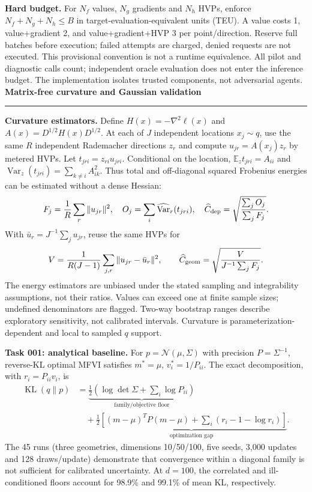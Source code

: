 \documentclass[11pt,a4paper]{article}
\newcommand{\sectiontitle}[2]{\vspace*{1mm}{\large\bfseries\textcolor{muted}{#1}}\\[2pt]{\LARGE\bfseries\textcolor{ink}{#2}}\par\vspace{2mm}\hrule\vspace{3mm}}
\newcommand{\KL}{\operatorname{KL}}
\newcommand{\E}{\mathbb E}
\begin{document}
\textbf{Hard budget.} For $N_f$ values, $N_g$ gradients and $N_h$ HVPs, enforce $N_f+N_g+N_h\le B$ in target-evaluation-equivalent units (TEU). A value costs 1, value+gradient 2, and value+gradient+HVP 3 per point/direction. Reserve full batches before execution; failed attempts are charged, denied requests are not executed. This provisional convention is not a runtime equivalence. All pilot and diagnostic calls count; independent oracle evaluation does not enter the inference budget. The implementation isolates trusted components, not adversarial agents.
\newpage
\sectiontitle{METHODS / 03}{Matrix-free curvature and Gaussian validation}
\textbf{Curvature estimators.} Define $H(x)=-\nabla^2\ell(x)$ and $A(x)=D^{1/2}H(x)D^{1/2}$. At each of $J$ independent locations $x_j\sim q$, use the same $R$ independent Rademacher directions $z_r$ and compute $u_{jr}=A(x_j)z_r$ by metered HVPs. Let $t_{jri}=z_{ri}u_{jri}$. Conditional on the location, $\E_z t_{jri}=A_{ii}$ and $\operatorname{Var}_z(t_{jri})=\sum_{k\ne i}A_{ik}^2$. Thus total and off-diagonal squared Frobenius energies can be estimated without a dense Hessian:
\[F_j=\frac1R\sum_r\|u_{jr}\|^2,\quad O_j=\sum_i\widehat{\operatorname{Var}}_r(t_{jri}),\quad \widehat C_{\rm dep}=\sqrt{\frac{\sum_j O_j}{\sum_j F_j}}.\]
With $\bar u_r=J^{-1}\sum_j u_{jr}$, reuse the same HVPs for
\[V=\frac{1}{R(J-1)}\sum_{j,r}\|u_{jr}-\bar u_r\|^2,\qquad \widehat C_{\rm geom}=\sqrt{\frac{V}{J^{-1}\sum_j F_j}}.\]
The energy estimators are unbiased under the stated sampling and integrability assumptions, not their ratios. Values can exceed one at finite sample sizes; undefined denominators are flagged. Two-way bootstrap ranges describe exploratory sensitivity, not calibrated intervals. Curvature is parameterization-dependent and local to sampled $q$ support.

\textbf{Task 001: analytical baseline.} For $p=\mathcal N(\mu,\Sigma)$ with precision $P=\Sigma^{-1}$, reverse-KL optimal MFVI satisfies $m^*=\mu$, $v_i^*=1/P_{ii}$. The exact decomposition, with $r_i=P_{ii}v_i$, is
\begin{align*}
\KL(q\|p)&=\underbrace{\tfrac12(\log\det\Sigma+\sum_i\log P_{ii})}_{\text{family/objective floor}}\\[-1mm]
&\quad+\underbrace{\tfrac12[(m-\mu)^TP(m-\mu)+\sum_i(r_i-1-\log r_i)]}_{\text{optimization gap}}.
\end{align*}
The 45 runs (three geometries, dimensions 10/50/100, five seeds, 3,000 updates and 128 draws/update) demonstrate that convergence within a diagonal family is not sufficient for calibrated uncertainty. At $d=100$, the correlated and ill-conditioned floors account for 98.9\% and 99.1\% of mean KL, respectively.
\end{document}
